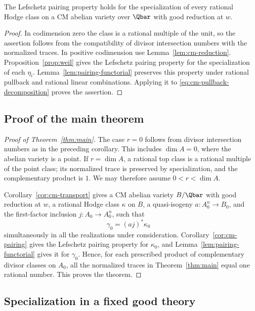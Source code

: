 \begin{corollary}
\label{cor:cm-pairing}
The Lefschetz pairing property holds for the specialization of every
rational Hodge class on a CM abelian variety over $\Qbar$ with good
reduction at $w$.
\end{corollary}

\begin{proof}
In codimension zero the class is a rational multiple of the unit, so
the assertion follows from the compatibility of divisor intersection
numbers with the normalized traces.  In positive codimension use
Lemma~\ref{lem:cm-reduction}.  Proposition~\ref{prop:weil} gives the
Lefschetz pairing property for the specialization of each $\eta_i$.
Lemma~\ref{lem:pairing-functorial} preserves this property under
rational pullback and rational linear combinations.  Applying it to
\eqref{eq:cm-pullback-decomposition} proves the assertion.
\end{proof}

\subsection{Proof of the main theorem}

\begin{proof}[Proof of Theorem~\ref{thm:main}]
The case \(r=0\) follows from divisor intersection numbers as in the
preceding corollary. This includes \(\dim A=0\), where the abelian
variety is a point. If \(r=\dim A\), a rational top class is a
rational multiple of the point class; its normalized trace is
preserved by specialization, and the complementary product is \(1\).
We may therefore assume \(0<r<\dim A\).

Corollary~\ref{cor:cm-transport} gives a CM abelian variety $B/\Qbar$ with good
reduction at $w$, a rational Hodge class $\kappa$ on $B$, a
quasi-isogeny $a\colon A_0^n\to B_0$, and the first-factor inclusion
$j\colon A_0\to A_0^n$, such that
\[
                            \gamma_0=(aj)^*\kappa_0
\]
simultaneously in all the realizations under consideration.
Corollary~\ref{cor:cm-pairing} gives the Lefschetz pairing property for
$\kappa_0$, and Lemma~\ref{lem:pairing-functorial} gives it for
$\gamma_0$.  Hence, for each prescribed product of complementary
divisor classes on $A_0$, all the normalized traces in
Theorem~\ref{thm:main} equal one rational number.  This proves the
theorem.
\end{proof}

\subsection{Specialization in a fixed good theory}

